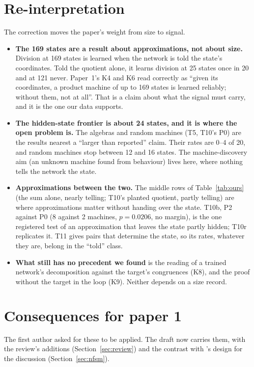 \documentclass[11pt]{article}
\begin{document}
\section{Re-interpretation}

The correction moves the paper's weight from size to signal.
\begin{itemize}
\item \textbf{The 169 states are a result about approximations, not about size.} Division at 169
  states is learned when the network is told the state's coordinates. Told the quotient alone, it
  learns division at 25 states once in 20 and at 121 never. Paper~1's K4 and K6 read correctly as
  ``given its coordinates, a product machine of up to 169 states is learned reliably; without them,
  not at all''. That is a claim about what the signal must carry, and it is the one our data
  supports.
\item \textbf{The hidden-state frontier is about 24 states, and it is where the open problem is.} The
  algebras and random machines (T5, T10's P0) are the results nearest a ``larger than reported''
  claim. Their rates are 0--4 of 20, and random machines stop between 12 and 16 states. The
  machine-discovery aim (an unknown machine found from behaviour) lives here, where nothing tells the
  network the state.
\item \textbf{Approximations between the two.} The middle rows of Table~\ref{tab:ours} (the sum
  alone, nearly telling; T10's planted quotient, partly telling) are where approximations matter
  without handing over the state. T10b, P2 against P0 (8 against 2 machines, $p = 0.0206$, no
  margin), is the one registered test of an approximation that leaves the state partly hidden; T10r
  replicates it. T11 gives pairs that determine the state, so its rates, whatever they are, belong in
  the ``told'' class.
\item \textbf{What still has no precedent we found} is the reading of a trained network's
  decomposition against the target's congruences (K8), and the proof without the target in the loop
  (K9). Neither depends on a size record.
\end{itemize}

\section{Consequences for paper 1}

The first author asked for these to be applied. The draft now carries them, with the review's
additions (Section~\ref{sec:review}) and the contrast with
\citeauthor{brandoit-2026-length-independent-state-tracking}'s design for the discussion
(Section~\ref{sec:nfsm}).
\end{document}
